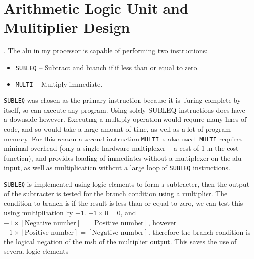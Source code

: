 \section{Arithmetic Logic Unit and Mulitiplier Design} \label{sec:alu-design}.
The \gls{alu} in my processor is capable of performing two instructions:
\begin{itemize}
	\item \texttt{SUBLEQ} -- Subtract and branch if if less than or equal to zero.
	\item \texttt{MULTI} -- Multiply immediate.
\end{itemize}
\texttt{SUBLEQ} was chosen as the primary instruction because it is Turing complete by itself, so can execute any program. Using solely SUBLEQ instructions does have a downside however. Executing a multiply operation would require many lines of code, and so would take a large amount of time, as well as a lot of program memory. For this reason a second instruction \texttt{MULTI} is also used. \texttt{MULTI} requires minimal overhead (only a single hardware multiplexer -- a cost of 1 in the cost function), and provides loading of immediates without a multiplexer on the \gls{alu} input, as well as multiplication without a large loop of \texttt{SUBLEQ} instructions.

\texttt{SUBLEQ} is implemented using logic elements to form a subtracter, then the output of the subtracter is tested for the branch condition using a multiplier. The condition to branch is if the result is less than or equal to zero, we can test this using multiplication by $-1$. $-1 \times 0 = 0$, and $-1 \times [\text{Negative number}] = [\text{Positive number}]$, however $-1 \times [\text{Positive number}] = [\text{Negative number}]$, therefore the branch condition is the logical negation of the \gls{msb} of the multiplier output. This saves the use of several logic elements.

